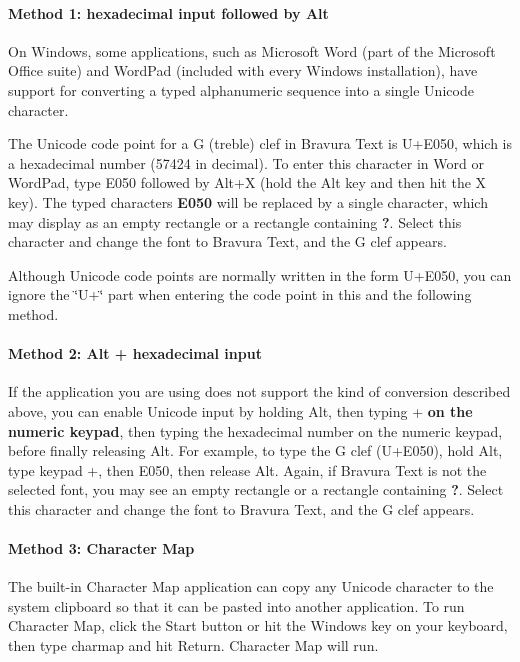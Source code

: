 \paragraph*{Method 1\+: hexadecimal input followed by {\ttfamily Alt}}

On Windows, some applications, such as Microsoft Word (part of the Microsoft Office suite) and Word\+Pad (included with every Windows installation), have support for converting a typed alphanumeric sequence into a single Unicode character.

The Unicode code point for a G (treble) clef in Bravura Text is U+\+E050, which is a hexadecimal number (57424 in decimal). To enter this character in Word or Word\+Pad, type {\ttfamily E050} followed by {\ttfamily Alt+X} (hold the {\ttfamily Alt} key and then hit the {\ttfamily X} key). The typed characters {\bfseries E050} will be replaced by a single character, which may display as an empty rectangle or a rectangle containing {\bfseries ?}. Select this character and change the font to Bravura Text, and the G clef appears.

Although Unicode code points are normally written in the form U+\+E050, you can ignore the \char`\"{}\+U+\char`\"{} part when entering the code point in this and the following method.

\paragraph*{Method 2\+: {\ttfamily Alt} + hexadecimal input}

If the application you are using does not support the kind of conversion described above, you can enable Unicode input by holding {\ttfamily Alt}, then typing {\ttfamily +} {\bfseries on the numeric keypad}, then typing the hexadecimal number on the numeric keypad, before finally releasing {\ttfamily Alt}. For example, to type the G clef (U+\+E050), hold {\ttfamily Alt}, type keypad {\ttfamily +}, then {\ttfamily E050}, then release {\ttfamily Alt}. Again, if Bravura Text is not the selected font, you may see an empty rectangle or a rectangle containing {\bfseries ?}. Select this character and change the font to Bravura Text, and the G clef appears.

\paragraph*{Method 3\+: Character Map}

The built-\/in Character Map application can copy any Unicode character to the system clipboard so that it can be pasted into another application. To run Character Map, click the {\ttfamily Start} button or hit the {\ttfamily Windows} key on your keyboard, then type {\ttfamily charmap} and hit {\ttfamily Return}. Character Map will run.

